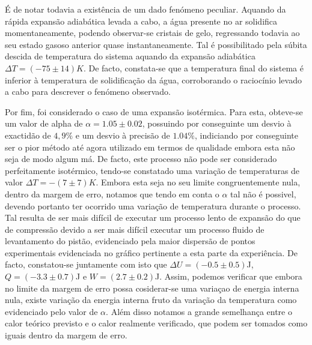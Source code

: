 \documentclass[9pt]{extarticle}
\begin{document}
\begin{multicols}{2}
\par É de notar todavia a existência de um dado fenómeno peculiar. Aquando da rápida expansão adiabática levada a cabo, a água presente no ar solidifica momentaneamente, podendo observar-se cristais de gelo, regressando todavia ao seu estado gasoso anterior quase instantaneamente. Tal é possibilitado pela súbita descida de temperatura do sistema aquando da expansão adiabática $\Delta T=(-75\pm14)K$. De facto, constata-se que a temperatura final do sistema é inferior à temperatura de solidificação da água, corroborando o raciocínio levado a cabo para descrever o fenómeno observado.

\par Por fim, foi considerado o caso de uma expansão isotérmica. Para esta, obteve-se um valor de alpha de $\alpha=1.05\pm0.02$, possuindo por conseguinte um desvio à exactidão de $4,9\%$ e um desvio à precisão de $1.04\%$, indiciando por conseguinte ser o pior método até agora utilizado em termos de qualidade embora esta não seja de modo algum má. De facto, este processo não pode ser considerado perfeitamente isotérmico, tendo-se constatado uma variação de temperaturas de valor $\Delta T=-(7\pm7)K$. Embora esta seja no seu limite congruentemente nula, dentro da margem de erro, notamos que tendo em conta o $\alpha$ tal não é possivel, devendo portanto ter ocorrido uma variação de temperatura durante o processo. Tal resulta de ser mais difícil de executar um processo lento de expansão do que de compressão devido a ser mais difícil executar um processo fluido de levantamento do pistão, evidenciado pela maior dispersão de pontos experimentais evidenciada no gráfico pertinente a esta parte da experiência. De facto, constatou-se juntamente com isto que $\Delta U=(-0.5\pm0.5)$J, $Q=(-3.3\pm0.7)$J e $W=(2.7\pm0.2)$J. Assim, podemos verificar que embora no limite da margem de erro possa cosiderar-se uma variaçao de energia interna nula, existe variação da energia interna fruto da variação da temperatura como evidenciado pelo valor de $\alpha$. Além disso notamos a grande semelhança entre o calor teórico previsto e o calor realmente verificado, que podem ser tomados como iguais dentro da margem de erro.


\end{multicols}
\end{document}
